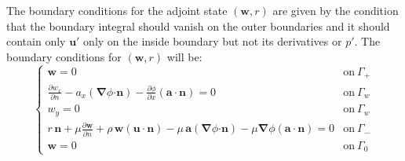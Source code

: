 \documentclass[12pt, a4paper]{article}
\begin{document}
The boundary conditions for the adjoint state $(\mathbf{w}, r)$ are given by the condition that the boundary integral should vanish on the outer boundaries and it should contain only $\mathbf{u'}$ only on the inside boundary but not its derivatives or $p'$. The boundary conditions for $(\mathbf{w}, r)$ will be:
\begin{equation}
\begin{cases}
\mathbf{w} = 0	 	&	\text{on}\ \Gamma_+ \\
\frac{\partial w_x}{\partial n} - a_x (\boldsymbol{\nabla} \phi \mathbf{\cdot n}) - 
\frac{\partial \phi}{\partial x} (\mathbf{a \cdot n}) = 0	&	\text{on}\ \Gamma_w \\
w_y = 0				&	\text{on}\ \Gamma_w \\
r \, \mathbf{n} + \mu \frac{\partial \mathbf{w}}{\partial n} + \rho \, \mathbf{w} (\mathbf{u \cdot n}) - 
\mu \, \mathbf{a} (\boldsymbol{\nabla} \phi \mathbf{\cdot n}) - 
\mu \boldsymbol{\nabla} \phi (\mathbf{a \cdot n}) = 0	   	&	\text{on}\ \Gamma_- \\
\mathbf{w} = 0	 	&	\text{on}\ \Gamma_0
\end{cases}
\end{equation}
\end{document}
